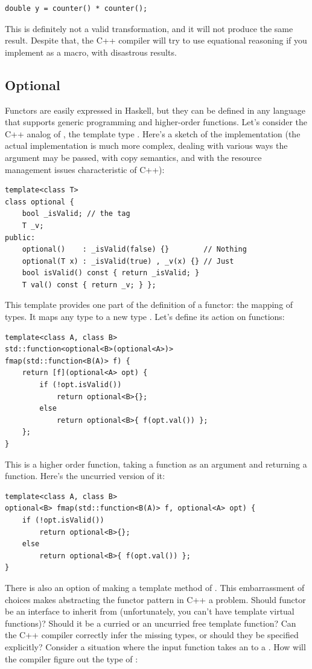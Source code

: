 \begin{Verbatim}
double y = counter() * counter();
\end{Verbatim}
This is definitely not a valid transformation, and it will not produce
the same result. Despite that, the C++ compiler will try to use
equational reasoning if you implement  as a macro, with
disastrous results.

\subsection{Optional}\label{optional}

Functors are easily expressed in Haskell, but they can be defined in any
language that supports generic programming and higher-order functions.
Let's consider the C++ analog of , the template type
. Here's a sketch of the implementation (the actual
implementation is much more complex, dealing with various ways the
argument may be passed, with copy semantics, and with the resource
management issues characteristic of C++):

\begin{Verbatim}
template<class T>
class optional { 
    bool _isValid; // the tag
    T _v;
public:
    optional()    : _isValid(false) {}        // Nothing
    optional(T x) : _isValid(true) , _v(x) {} // Just
    bool isValid() const { return _isValid; }
    T val() const { return _v; } };
\end{Verbatim}
This template provides one part of the definition of a functor: the
mapping of types. It maps any type  to a new type
. Let's define its action on
functions:

\begin{Verbatim}
template<class A, class B>
std::function<optional<B>(optional<A>)>
fmap(std::function<B(A)> f) { 
    return [f](optional<A> opt) { 
        if (!opt.isValid()) 
            return optional<B>{};
        else 
            return optional<B>{ f(opt.val()) };
    };
}
\end{Verbatim}
This is a higher order function, taking a function as an argument and
returning a function. Here's the uncurried version of it:

\begin{Verbatim}
template<class A, class B>
optional<B> fmap(std::function<B(A)> f, optional<A> opt) { 
    if (!opt.isValid())
        return optional<B>{};
    else 
        return optional<B>{ f(opt.val()) };
}
\end{Verbatim}
There is also an option of making  a template method of
. This embarrassment of choices makes abstracting the
functor pattern in C++ a problem. Should functor be an interface to
inherit from (unfortunately, you can't have template virtual functions)?
Should it be a curried or an uncurried free template function? Can the
C++ compiler correctly infer the missing types, or should they be
specified explicitly? Consider a situation where the input function
 takes an  to a . How will the
compiler figure out the type of :

